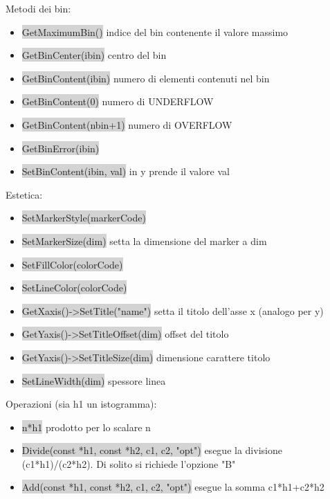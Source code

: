 \documentclass[a4paper]{article}
\begin{document}
    Metodi dei bin:
    \begin{itemize}
        \item \colorbox{LightGray}{GetMaximumBin()} indice del bin contenente il valore massimo
        \item \colorbox{LightGray}{GetBinCenter(ibin)} centro del bin
        \item \colorbox{LightGray}{GetBinContent(ibin)} numero di elementi contenuti nel bin
        \item \colorbox{LightGray}{GetBinContent(0)} numero di UNDERFLOW
        \item \colorbox{LightGray}{GetBinContent(nbin+1)} numero di OVERFLOW
        \item \colorbox{LightGray}{GetBinError(ibin)}
        \item \colorbox{LightGray}{SetBinContent(ibin, val)} in y prende il valore val
    \end{itemize}
    Estetica:
    \begin{itemize}
        \item \colorbox{LightGray}{SetMarkerStyle(markerCode)}
        \item \colorbox{LightGray}{SetMarkerSize(dim)} setta la dimensione del marker a dim
        \item \colorbox{LightGray}{SetFillColor(colorCode)}
        \item \colorbox{LightGray}{SetLineColor(colorCode)}
        \item \colorbox{LightGray}{GetXaxis()->SetTitle("name")} setta il titolo dell'asse x (analogo per y)
        \item \colorbox{LightGray}{GetYaxis()->SetTitleOffset(dim)} offset del titolo
        \item \colorbox{LightGray}{GetYaxis()->SetTitleSize(dim)} dimensione carattere titolo
        \item \colorbox{LightGray}{SetLineWidth(dim)} spessore linea
    \end{itemize}
    Operazioni (sia h1 un istogramma):
    \begin{itemize}
        \item \colorbox{LightGray}{n*h1} prodotto per lo scalare n
        \item \colorbox{LightGray}{Divide(const *h1, const *h2, c1, c2, "opt")} esegue la divisione (c1*h1)/(c2*h2). Di solito si richiede l'opzione "B"
        \item \colorbox{LightGray}{Add(const *h1, const *h2, c1, c2, "opt")} esegue la somma c1*h1+c2*h2
    \end{itemize}
\end{document}
